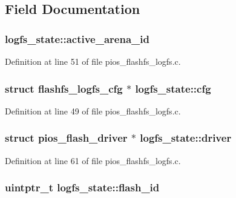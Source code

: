 \subsection{Field Documentation}
\hypertarget{structlogfs__state_a5bcf852bc8ba378be9bf82a602070073}{
\subsubsection[{active\-\_\-arena\-\_\-id}]{ logfs\-\_\-state\-::active\-\_\-arena\-\_\-id}}\label{structlogfs__state_a5bcf852bc8ba378be9bf82a602070073}


Definition at line 51 of file pios\-\_\-flashfs\-\_\-logfs.\-c.

\hypertarget{structlogfs__state_aaa095628949748fcf88691272e19689e}{
\subsubsection[{cfg}]{\setlength{\rightskip}{0pt plus 5cm}struct {\bf flashfs\-\_\-logfs\-\_\-cfg} $\ast$ logfs\-\_\-state\-::cfg}}\label{structlogfs__state_aaa095628949748fcf88691272e19689e}


Definition at line 49 of file pios\-\_\-flashfs\-\_\-logfs.\-c.

\hypertarget{structlogfs__state_a739ae114cf41b74afe9f40cd312c677e}{
\subsubsection[{driver}]{\setlength{\rightskip}{0pt plus 5cm}struct {\bf pios\-\_\-flash\-\_\-driver} $\ast$ logfs\-\_\-state\-::driver}}\label{structlogfs__state_a739ae114cf41b74afe9f40cd312c677e}


Definition at line 61 of file pios\-\_\-flashfs\-\_\-logfs.\-c.

\hypertarget{structlogfs__state_a29a28723508e259cd39e4ce4bff7827d}{
\subsubsection[{flash\-\_\-id}]{\setlength{\rightskip}{0pt plus 5cm}uintptr\-\_\-t logfs\-\_\-state\-::flash\-\_\-id}}\label{structlogfs__state_a29a28723508e259cd39e4ce4bff7827d}


